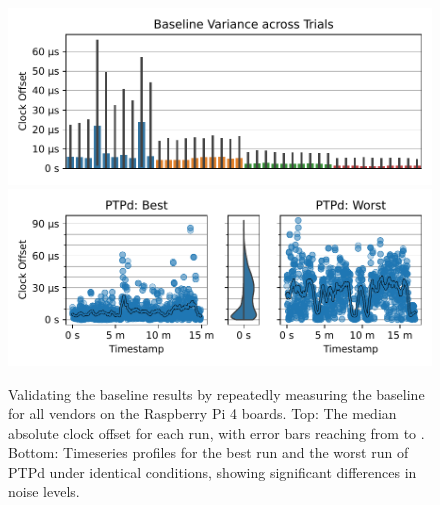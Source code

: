 

\begin{figure}
    \centering
    \includegraphics[width=\linewidth]{res/generated/base/key_metric_variance_rpi-4.pdf}
    \includegraphics[width=\linewidth]{res/generated/base/ptpd-good-vs-bad.pdf}

    \legend
    \caption{Validating the baseline results by repeatedly measuring the
    baseline for all vendors on the Raspberry Pi 4 boards.
    Top: The median absolute clock offset for each run, with error bars reaching
    from \PFive{} to \PNineFive{}.
    Bottom: Timeseries profiles for the best run and the worst run of PTPd under
    identical conditions, showing significant differences in noise levels.}
    \label{fig:baseline_reproducibility}
\end{figure}


